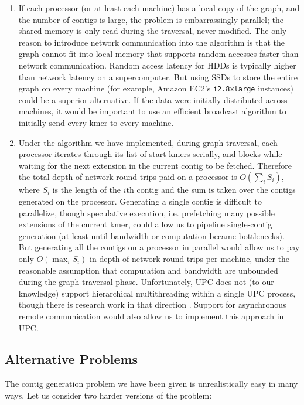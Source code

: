 \documentclass{article}
\begin{document}
\begin{enumerate}
  \item If each processor (or at least each machine) has a local copy of the graph, and the number of contigs is large, the problem is embarrassingly parallel; the shared memory is only read during the traversal, never modified.  The only reason to introduce network communication into the algorithm is that the graph cannot fit into local memory that supports random accesses faster than network communication.  Random access latency for HDDs is typically higher than network latency on a supercomputer.  But using SSDs to store the entire graph on every machine (for example, Amazon EC2's \texttt{i2.8xlarge} instances) could be a superior alternative.  If the data were initially distributed across machines, it would be important to use an efficient broadcast algorithm to initially send every kmer to every machine.
  \item Under the algorithm we have implemented, during graph traversal, each processor iterates through its list of start kmers serially, and blocks while waiting for the next extension in the current contig to be fetched.  Therefore the total depth of network round-trips paid on a processor is $O(\sum_i S_i)$, where $S_i$ is the length of the $i$th contig and the sum is taken over the contigs generated on the processor.  Generating a single contig is difficult to parallelize, though speculative execution, i.e. prefetching many possible extensions of the current kmer, could allow us to pipeline single-contig generation (at least until bandwidth or computation became bottlenecks).  But generating all the contigs on a processor in parallel would allow us to pay only $O(\max_i S_i)$ in depth of network round-trips per machine, under the reasonable assumption that computation and bandwidth are unbounded during the graph traversal phase.  Unfortunately, UPC does not (to our knowledge) support hierarchical multithreading within a single UPC process, though there is research work in that direction \cite{wang2011exploiting}.  Support for asynchronous remote communication would also allow us to implement this approach in UPC.
\end{enumerate}

\subsection{Alternative Problems}
The contig generation problem we have been given is unrealistically easy in many ways.  Let us consider two harder versions of the problem:
\end{document}

